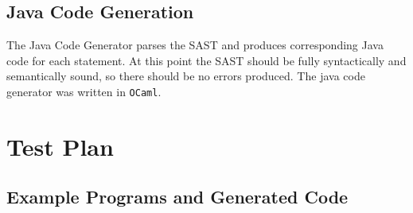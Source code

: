 \documentclass{article}
\begin{document}
\subsection{Java Code Generation}
The Java Code Generator parses the SAST and produces corresponding Java code for each statement. At this point the SAST should be fully syntactically and semantically sound, so there should be no errors produced. The java code generator was written in \texttt{OCaml}.

\section{Test Plan}
\subsection{Example Programs and Generated Code}
\end{document}
